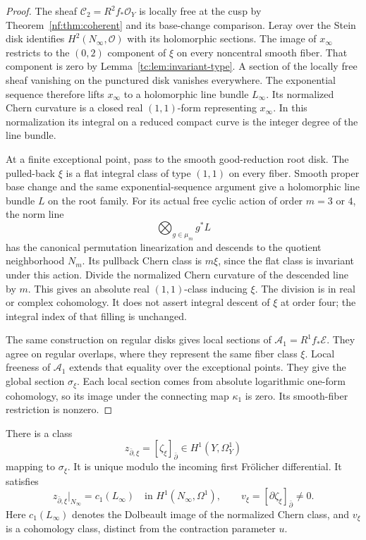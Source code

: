 \begin{proof}
The sheaf $\mathcal C_2=R^2f_*\mathcal O_Y$ is locally free
at the cusp by Theorem~\ref{nf:thm:coherent} and its
base-change comparison. Leray over the Stein disk identifies
$H^2(N_\infty,\mathcal O)$ with its holomorphic sections.
The image of $x_\infty$ restricts to the $(0,2)$ component of
$\xi$ on every noncentral smooth fiber. That component is zero
by Lemma~\ref{tc:lem:invariant-type}.
A section of the locally free sheaf vanishing on the punctured
disk vanishes everywhere. The exponential sequence therefore
lifts $x_\infty$ to a holomorphic line bundle $L_\infty$.
Its normalized Chern curvature is a closed real $(1,1)$-form
representing $x_\infty$. In this normalization its integral on
a reduced compact curve is the integer degree of the line bundle.

At a finite exceptional point, pass to the smooth
good-reduction root disk. The pulled-back $\xi$ is a flat
integral class of type $(1,1)$ on every fiber.
Smooth proper base change and the same exponential-sequence
argument give a holomorphic line bundle $L$ on the root family.
For its actual free cyclic action of order $m=3$ or $4$, the
norm line
\[
                         \bigotimes_{g\in\mu_m}g^*L
\]
has the canonical permutation linearization and descends to
the quotient neighborhood $N_m$. Its pullback Chern class is
$m\xi$, since the flat class is invariant under this action.
Divide the normalized Chern curvature of the descended line by
$m$. This gives an absolute real $(1,1)$-class inducing $\xi$.
The division is in real or complex cohomology. It does not
assert integral descent of $\xi$ at order four; the integral
index of that filling is unchanged.

The same construction on regular disks gives local sections of
$\mathcal A_1=R^1f_*\mathscr E$.
They agree on regular overlaps, where they represent the same
fiber class $\xi$. Local freeness of $\mathcal A_1$ extends
that equality over the exceptional points.
They give the global section $\sigma_\xi$.
Each local section comes from absolute logarithmic one-form
cohomology, so its image under the connecting map $\kappa_1$
is zero. Its smooth-fiber restriction is nonzero.
\end{proof}

\begin{proposition}\label{tc:prop:ordinary-lift}
There is a class
\[
 z_{\bar\partial,\xi}=[\zeta_\xi]_{\bar\partial}
                      \in H^1(Y,\Omega_Y^1)
\]
mapping to $\sigma_\xi$. It is unique modulo the incoming
first Fr\"olicher differential. It satisfies
\begin{equation}\label{tc:eq:cusp-Dolbeault-comparison}
 z_{\bar\partial,\xi}|_{N_\infty}
       =c_1(L_\infty)\quad\text{in }H^1(N_\infty,\Omega^1),
 \qquad
 v_\xi=[\partial\zeta_\xi]_{\bar\partial}\ne0.
\end{equation}
Here $c_1(L_\infty)$ denotes the Dolbeault image of the
normalized Chern class, and $v_\xi$ is a cohomology class,
distinct from the contraction parameter $u$.
\end{proposition}

